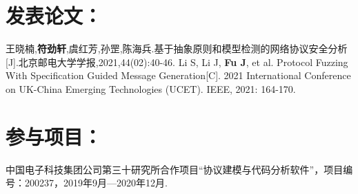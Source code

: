 \documentclass[master]{thesis-uestc}
\begin{document}
\titlespacing{\section}{-24pt}{18pt}{6pt}
\begin{thesistheaccomplish}
	
	
	\section*{发表论文：}
	\bibitem[1]{} 王晓楠,\textbf{符劲轩},虞红芳,孙罡,陈海兵.基于抽象原则和模型检测的网络协议安全分析[J].北京邮电大学学报,2021,44(02):40-46.
	\bibitem[2]{} Li S, Li J, \textbf{Fu J}, et al. Protocol Fuzzing With Specification Guided Message Generation[C]. 2021 International Conference on UK-China Emerging Technologies (UCET). IEEE, 2021: 164-170.

	
	\section*{参与项目：}
	\bibitem[1]{} 中国电子科技集团公司第三十研究所合作项目“协议建模与代码分析软件”，项目编号：200237，2019年9月—2020年12月.
	
\end{thesistheaccomplish}
\titlespacing{\section}{0pt}{18pt}{6pt}

\end{document}
